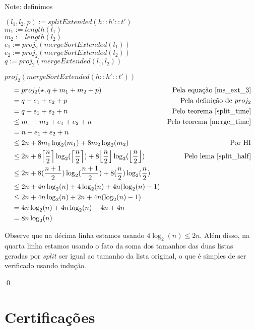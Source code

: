 \documentclass[12pt, oneside, a4paper,english,brazil]{abntex2}
\DeclarePairedDelimiter\floor{\lfloor}{\rfloor}
\DeclarePairedDelimiter\ceil{\lceil}{\rceil}
\begin{document}
Note: definimos
\begin{center}
  $(l_{1}, l_{2}, p) := splitExtended(h :: h' :: t')$\\
  $m_{1} := length(l_{1})$\\
  $m_{2} := length(l_{2})$\\
  $e_{1} := proj_{2}(mergeSortExtended(l_{1}))$\\
  $e_{2} := proj_{2}(mergeSortExtended(l_{2}))$\\
  $q := proj_{2}(mergeExtended(l_{1}, l_{2}))$\\
\end{center}

$proj_{2}(mergeSortExtended(h :: h' :: t'))$
\begin{align*}
  &= proj_{2}(\star, q + m_{1} + m_{2} + p) &\text{Pela equa\c{c}\~ao \ref{ms_ext_3}}\\
  &= q + e_{1} + e_{2} + p &\text{Pela defini\c{c}\~ao de $proj_{2}$}\\
  &= q + e_{1} + e_{2} + n &\text{Pelo teorema \ref{split_time}}\\
  &\le m_{1} + m_{2} + e_{1} + e_{2} + n &\text{Pelo teorema \ref{merge_time}}\\
  &= n + e_{1} + e_{2} + n\\
  &\le 2n + 8m_{1}\log_{2}(m_{1}) + 8m_{2}\log_{2}(m_{2}) &\text{Por HI}\\
  &\le 2n + 8\ceil*{\frac{n}{2}}\log_{2}(\ceil*{\frac{n}{2}}) + 8\floor*{\frac{n}{2}}\log_{2}(\floor*{\frac{n}{2}}) &\text{Pelo lema \ref{split_half}}\\
  &\le 2n + 8(\frac{n + 1}{2})\log_{2}(\frac{n + 1}{2}) + 8(\frac{n}{2})\log_{2}(\frac{n}{2}) \\
  &\le 2n + 4n\log_{2}(n) + 4\log_{2}(n) + 4n(\log_{2}(n) - 1)\\
  &\le 2n + 4n\log_{2}(n) + 2n + 4n(\log_{2}(n) - 1)\\
  &= 4n\log_{2}(n) + 4n\log_{2}(n) - 4n + 4n\\
  &= 8n\log_{2}(n)
\end{align*}

Observe que na d\'ecima linha estamos usando $4\log_{2}(n) \le 2n$. Al\'em disso, na quarta linha estamos usando o fato da soma dos tamanhos das duas listas geradas por $split$ ser igual ao tamanho da lista original, o que \'e simples de ser verificado usando indu\c{c}\~ao.

\qed

\section{Certifica\c{c}\~oes}
\end{document}
